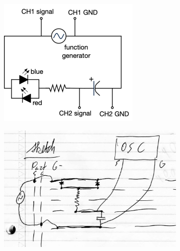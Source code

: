 \documentclass{article}
\begin{document}
        

        \begin{figure}[h]
            \begin{subfigure}{\textwidth/3}
                \includegraphics[width=\linewidth]{g115.png}
                \caption{}
            \end{subfigure}
            \begin{subfigure}{\textwidth/3}
                \includegraphics[width=\linewidth]{breadboard.png}
                \caption{}
            \end{subfigure}
            \begin{subfigure}{\textwidth/3}

\end{subfigure}
\end{figure}
\end{document}
